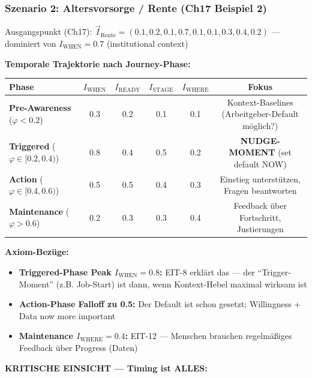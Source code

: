 \subsubsection{Szenario 2: Altersvorsorge / Rente (Ch17 Beispiel 2)}

Ausgangspunkt (Ch17): $\vec{I}_{\text{Rente}} = (0.1, 0.2, 0.1, 0.7, 0.1, 0.1, 0.3, 0.4, 0.2)$ — dominiert von $I_{\text{WHEN}} = 0.7$ (institutional context)

\textbf{Temporale Trajektorie nach Journey-Phase:}

\begin{center}
\small
\renewcommand{\arraystretch}{1.3}
\begin{tabular}{@{}lccccc@{}}
\toprule
\textbf{Phase} & $I_{\text{WHEN}}$ & $I_{\text{READY}}$ & $I_{\text{STAGE}}$ & $I_{\text{WHERE}}$ & \textbf{Fokus} \\
\midrule
\textbf{Pre-Awareness} ($\varphi < 0.2$) & 0.3 & 0.2 & 0.1 & 0.1 & Kontext-Baselines (Arbeitgeber-Default möglich?) \\
\textbf{Triggered} ($\varphi \in [0.2, 0.4)$) & 0.8 & 0.4 & 0.5 & 0.2 & \textbf{NUDGE-MOMENT} (set default NOW) \\
\textbf{Action} ($\varphi \in [0.4, 0.6)$) & 0.5 & 0.5 & 0.4 & 0.3 & Einstieg unterstützen, Fragen beantworten \\
\textbf{Maintenance} ($\varphi > 0.6$) & 0.2 & 0.3 & 0.3 & 0.4 & Feedback über Fortschritt, Justierungen \\
\bottomrule
\end{tabular}
\end{center}

\textbf{Axiom-Bezüge:}
\begin{itemize}[nosep]
\item \textbf{Triggered-Phase Peak $I_{\text{WHEN}} = 0.8$:} EIT-8 erklärt das --- der ``Trigger-Moment'' (z.B. Job-Start) ist dann, wenn Kontext-Hebel maximal wirksam ist
\item \textbf{Action-Phase Falloff zu 0.5:} Der Default ist schon gesetzt; Willingness + Data now more important
\item \textbf{Maintenance $I_{\text{WHERE}} = 0.4$:} EIT-12 --- Menschen brauchen regelmäßiges Feedback über Progress (Daten)
\end{itemize}

\textbf{KRITISCHE EINSICHT --- Timing ist ALLES:}

